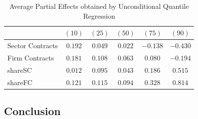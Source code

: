 \begin{table}[]
\scriptsize
\centering
\caption{Average Partial Effects obtained by Unconditional Quantile Regression}\vspace{0.2cm}
\label{APEs:UQR}
\begin{tabular}{l|ccccc}

                    & $(10)$ & $(25)$ & $(50)$ & $(75)$ & $(90)$ \\
  \hline
  Sector Contracts  & $0.192$ & $0.049$ & $0.022$ & $-0.138$ & $-0.430$ \\
  Firm Contracts    & $0.181$ & $0.108$ & $0.063$ & $0.080$ & $-0.194$ \\
  shareSC           & $0.012$ & $0.095$ & $0.043$ & $0.186$ & $0.515$ \\
  shareFC           & $0.121$ & $0.115$ & $0.094$ & $0.328$ & $0.814$ \\
  \hline
\end{tabular}
\end{table}

\subsection{Conclusion}
